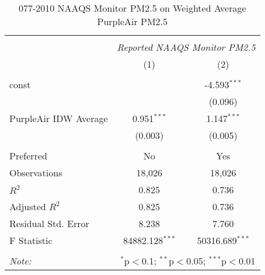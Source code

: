 \begin{table}[!htbp] \centering
  \caption{077-2010 NAAQS Monitor PM2.5 on Weighted Average PurpleAir PM2.5}
  \label{tab:reg_077-2010}
\begin{tabular}{@{\extracolsep{5pt}}lcc}
\\[-1.8ex]\hline
\hline \\[-1.8ex]
& \multicolumn{2}{c}{\textit{Reported NAAQS Monitor PM2.5}} \
\cr \cline{2-3}
\\[-1.8ex] & (1) & (2) \\
\hline \\[-1.8ex]
 const & & -4.593$^{***}$ \\
  & & (0.096) \\
 PurpleAir IDW Average & 0.951$^{***}$ & 1.147$^{***}$ \\
  & (0.003) & (0.005) \\
\hline \\[-1.8ex]
 Preferred & No & Yes \\
 Observations & 18,026 & 18,026 \\
 $R^2$ & 0.825 & 0.736 \\
 Adjusted $R^2$ & 0.825 & 0.736 \\
 Residual Std. Error & 8.238 & 7.760  \\
 F Statistic & 84882.128$^{***}$  & 50316.689$^{***}$  \\
\hline
\hline \\[-1.8ex]
\textit{Note:} & \multicolumn{2}{r}{$^{*}$p$<$0.1; $^{**}$p$<$0.05; $^{***}$p$<$0.01} \\
\end{tabular}
\end{table}
